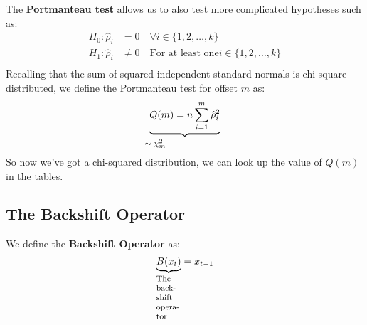 The \textbf{Portmanteau test} allows us to also test more complicated
hypotheses such as:
\begin{equation*}
    \begin{aligned}
        H_0: \hat{\rho}_i &= 0 \quad \forall i \in \{1, 2, \dots, k\} \\
        H_1: \hat{\rho}_i &\ne 0 \quad \text{For at least one} i \in \{1, 2, \dots, k\} \\
    \end{aligned}
\end{equation*}
Recalling that the sum of squared independent standard normals is
chi-square distributed, we define the Portmanteau test for offset $m$ as:
\begin{equation*}
    \explain{Q(m) = n \sum_{i=1}^{m} \hat{\rho}_i^2}{$\sim \chi^2_m$}
\end{equation*}
So now we've got a chi-squared distribution, we can look up the value of $Q(m)$
in the tables.

\subsection{The Backshift Operator}
We define the \textbf{Backshift Operator} as:
\begin{equation*}
    \explain{B(x_t)}{The backshift operator} = x_{t-1}
\end{equation*}

